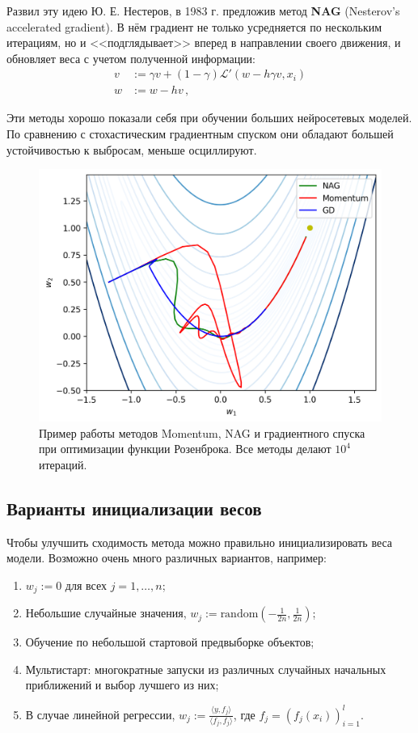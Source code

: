 Развил эту идею Ю. Е. Нестеров, в 1983 г. предложив метод \textbf{NAG} (Nesterov's accelerated gradient). В нём градиент не только усредняется по нескольким итерациям, но и <<подглядывает>> вперед в направлении своего движения, и обновляет веса с учетом полученной информации:
\begin{align*}
	v & := \gamma v + (1 - \gamma) \mathcal{L}'(w - h \gamma v, x_i) \\
	w & := w - h v\,,
\end{align*}

Эти методы хорошо показали себя при обучении больших нейросетевых моделей. По сравнению с стохастическим градиентным спуском они обладают большей устойчивостью к выбросам, меньше осциллируют.

\begin{figure}[h]
	\centering
	\includegraphics[width=0.6\linewidth]{chapters/neural/images/nag_momentum_gd.png}
	\caption{Пример работы методов Momentum, NAG и градиентного спуска при оптимизации функции Розенброка. Все методы делают $10^4$ итераций.}
	\label{img:gd_osc}
\end{figure}

\subsection{Варианты инициализации весов}

Чтобы улучшить сходимость метода можно правильно инициализировать веса модели. Возможно очень много различных вариантов, например:
\begin{enumerate}
	\item $w_j := 0$ для всех $j=1,\dots,n$;
	\item Небольшие случайные значения, $w_j := \text{random}\left(-\frac{1}{2n}, \frac{1}{2n}\right)$;
	\item Обучение по небольшой стартовой предвыборке объектов;
	\item Мультистарт: многократные запуски из различных случайных начальных приближений и выбор лучшего из них;
	\item В случае линейной регрессии, $w_j := \frac{\langle y, f_j \rangle}{\langle f_j, f_j \rangle}$, где $f_j = (f_j(x_i))_{i=1}^l$.
\end{enumerate}

